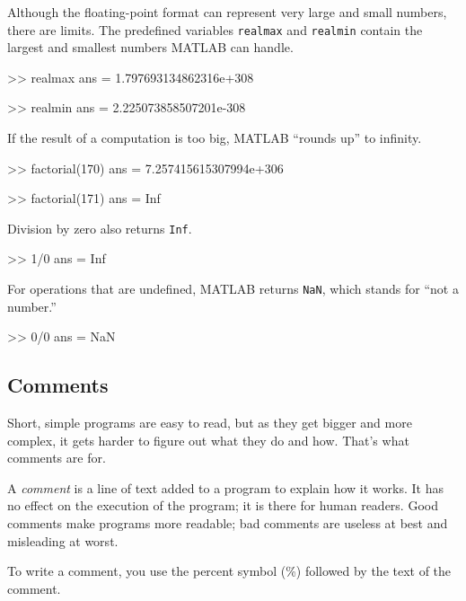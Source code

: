 \documentclass[../../book.tex]{subfiles}
\begin{document}
Although the floating-point format can represent very large and small numbers,
there are limits.
The predefined variables \lstinline{realmax} and \lstinline{realmin}
contain the largest and smallest numbers MATLAB
can handle.


\begin{code}
>> realmax
ans = 1.797693134862316e+308

>> realmin
ans = 2.225073858507201e-308
\end{code}

If the result of a computation is too big, MATLAB ``rounds up''
to \mbox{infinity}.


\begin{code}
>> factorial(170)
ans = 7.257415615307994e+306

>> factorial(171)
ans = Inf
\end{code}

Division by zero also returns \lstinline{Inf}.

\begin{code}
>> 1/0
ans = Inf
\end{code}


For operations that are undefined, MATLAB returns \lstinline{NaN},
which stands for ``not a number.''


\begin{code}
>> 0/0
ans = NaN
\end{code}


\subsection{Comments}

Short, simple programs are easy to read, but as they get bigger and more complex, it gets harder to figure out what they do and how.  That's what comments are for.

A \emph{comment} is a line of text added to a program to explain how it works. It has no effect on the execution of the program; it is there for human readers.
Good comments make programs more readable; bad comments are useless at best and misleading at worst.

To write a comment, you use the percent symbol (\%) followed by the text of the comment.
\end{document}
